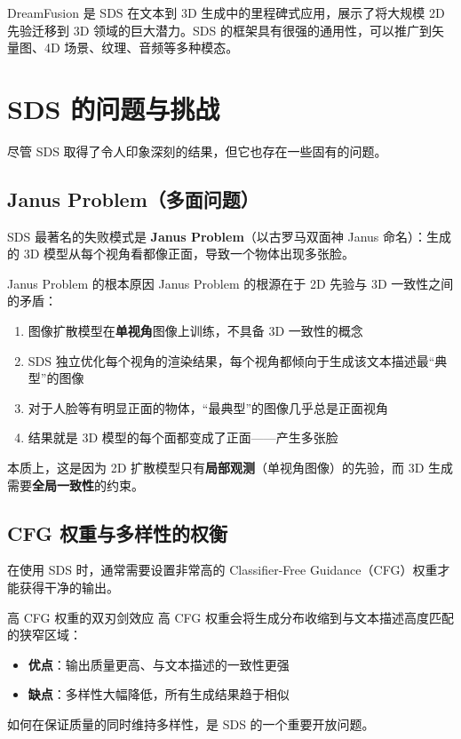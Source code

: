 \documentclass[a4paper]{article}
\begin{document}
DreamFusion 是 SDS 在文本到 3D 生成中的里程碑式应用，展示了将大规模 2D 先验迁移到 3D 领域的巨大潜力。SDS 的框架具有很强的通用性，可以推广到矢量图、4D 场景、纹理、音频等多种模态。

\newpage
\section{SDS 的问题与挑战}

尽管 SDS 取得了令人印象深刻的结果，但它也存在一些固有的问题。

\subsection{Janus Problem（多面问题）}

SDS 最著名的失败模式是 \textbf{Janus Problem}（以古罗马双面神 Janus 命名）：生成的 3D 模型从每个视角看都像正面，导致一个物体出现多张脸。

\begin{warningbox}{Janus Problem 的根本原因}
Janus Problem 的根源在于 2D 先验与 3D 一致性之间的矛盾：

\begin{enumerate}
    \item 图像扩散模型在\textbf{单视角}图像上训练，不具备 3D 一致性的概念
    \item SDS 独立优化每个视角的渲染结果，每个视角都倾向于生成该文本描述最``典型''的图像
    \item 对于人脸等有明显正面的物体，``最典型''的图像几乎总是正面视角
    \item 结果就是 3D 模型的每个面都变成了正面——产生多张脸
\end{enumerate}

本质上，这是因为 2D 扩散模型只有\textbf{局部观测}（单视角图像）的先验，而 3D 生成需要\textbf{全局一致性}的约束。
\end{warningbox}

\subsection{CFG 权重与多样性的权衡}

在使用 SDS 时，通常需要设置非常高的 Classifier-Free Guidance（CFG）权重才能获得干净的输出。

\begin{knowledgebox}{高 CFG 权重的双刃剑效应}
高 CFG 权重会将生成分布收缩到与文本描述高度匹配的狭窄区域：

\begin{itemize}
    \item \textbf{优点}：输出质量更高、与文本描述的一致性更强
    \item \textbf{缺点}：多样性大幅降低，所有生成结果趋于相似
\end{itemize}

如何在保证质量的同时维持多样性，是 SDS 的一个重要开放问题。
\end{knowledgebox}
\end{document}
